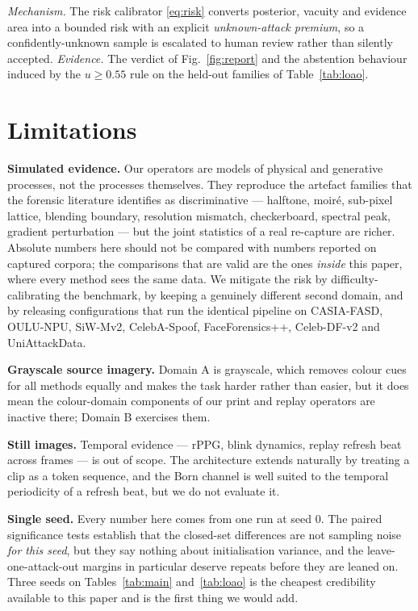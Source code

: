 \documentclass[conference]{IEEEtran}
\begin{document}
\emph{Mechanism.} The risk calibrator \eqref{eq:risk} converts posterior, vacuity
and evidence area into a bounded risk with an explicit \emph{unknown-attack
premium}, so a confidently-unknown sample is escalated to human review rather than
silently accepted. \emph{Evidence.} The verdict of Fig.~\ref{fig:report} and the
abstention behaviour induced by the $u\ge0.55$ rule on the held-out families of
Table~\ref{tab:loao}.

\section{Limitations}\label{sec:limits}

\textbf{Simulated evidence.} Our operators are models of physical and generative
processes, not the processes themselves. They reproduce the artefact families that
the forensic literature identifies as discriminative --- halftone, moir\'e,
sub-pixel lattice, blending boundary, resolution mismatch, checkerboard, spectral
peak, gradient perturbation --- but the joint statistics of a real re-capture are
richer. Absolute numbers here should not be compared with numbers reported on
captured corpora; the comparisons that are valid are the ones \emph{inside} this
paper, where every method sees the same data. We mitigate the risk by
difficulty-calibrating the benchmark, by keeping a genuinely different second
domain, and by releasing configurations that run the identical pipeline on
CASIA-FASD, OULU-NPU, SiW-Mv2, CelebA-Spoof, FaceForensics++, Celeb-DF-v2 and
UniAttackData.

\textbf{Grayscale source imagery.} Domain A is grayscale, which removes colour cues
for all methods equally and makes the task harder rather than easier, but it does
mean the colour-domain components of our print and replay operators are inactive
there; Domain B exercises them.

\textbf{Still images.} Temporal evidence --- rPPG, blink dynamics, replay refresh
beat across frames --- is out of scope. The architecture extends naturally by
treating a clip as a token sequence, and the Born channel is well suited to the
temporal periodicity of a refresh beat, but we do not evaluate it.

\textbf{Single seed.} Every number here comes from one run at seed 0. The paired
significance tests establish that the closed-set differences are not sampling noise
\emph{for this seed}, but they say nothing about initialisation variance, and the
leave-one-attack-out margins in particular deserve repeats before they are leaned
on. Three seeds on Tables~\ref{tab:main} and~\ref{tab:loao} is the cheapest
credibility available to this paper and is the first thing we would add.
\end{document}
